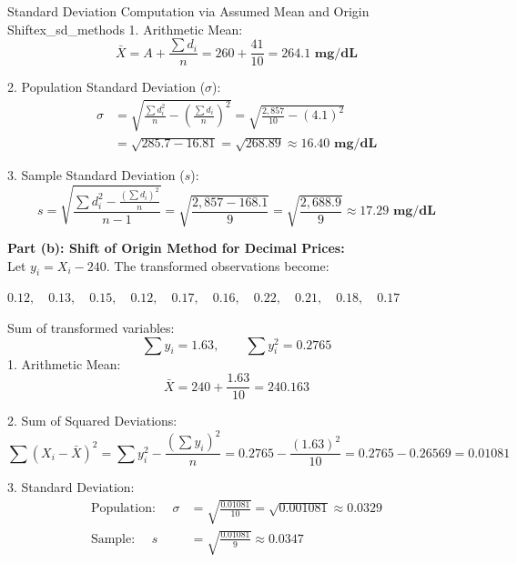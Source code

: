 \begin{example}{Standard Deviation Computation via Assumed Mean and Origin Shift}{ex_sd_methods}
1. Arithmetic Mean:
\begin{equation*}
    \bar{X} = A + \frac{\sum d_i}{n} = 260 + \frac{41}{10} = \mathbf{264.1 \text{ mg/dL}}
\end{equation*}

2. Population Standard Deviation ($\sigma$):
\begin{align*}
    \sigma &= \sqrt{\frac{\sum d_i^2}{n} - \left(\frac{\sum d_i}{n}\right)^2} = \sqrt{\frac{2{,}857}{10} - (4.1)^2} \\
           &= \sqrt{285.7 - 16.81} = \sqrt{268.89} \approx \mathbf{16.40 \text{ mg/dL}}
\end{align*}

3. Sample Standard Deviation ($s$):
\begin{equation*}
    s = \sqrt{\frac{\sum d_i^2 - \frac{(\sum d_i)^2}{n}}{n - 1}} = \sqrt{\frac{2{,}857 - 168.1}{9}} = \sqrt{\frac{2{,}688.9}{9}} \approx \mathbf{17.29 \text{ mg/dL}}
\end{equation*}

\tcbline
\textbf{Part (b): Shift of Origin Method for Decimal Prices:} \\
Let $y_i = X_i - 240$. The transformed observations become:
\begin{center}
    $0.12, \quad 0.13, \quad 0.15, \quad 0.12, \quad 0.17, \quad 0.16, \quad 0.22, \quad 0.21, \quad 0.18, \quad 0.17$
\end{center}
Sum of transformed variables:
\begin{equation*}
    \sum y_i = 1.63, \qquad \sum y_i^2 = 0.2765
\end{equation*}
1. Arithmetic Mean:
\begin{equation*}
    \bar{X} = 240 + \frac{1.63}{10} = \mathbf{240.163}
\end{equation*}

2. Sum of Squared Deviations:
\begin{equation*}
    \sum (X_i - \bar{X})^2 = \sum y_i^2 - \frac{(\sum y_i)^2}{n} = 0.2765 - \frac{(1.63)^2}{10} = 0.2765 - 0.26569 = \mathbf{0.01081}
\end{equation*}

3. Standard Deviation:
\begin{align*}
    \text{Population: } \quad \sigma &= \sqrt{\frac{0.01081}{10}} = \sqrt{0.001081} \approx \mathbf{0.0329} \\
    \text{Sample: } \quad s &= \sqrt{\frac{0.01081}{9}} \approx \mathbf{0.0347}
\end{align*}
\end{example}

